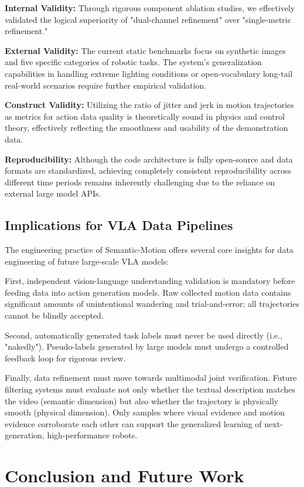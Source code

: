 \documentclass[11pt,oneside]{report}
\begin{document}
\textbf{Internal Validity:} Through rigorous component ablation studies, we effectively validated the logical superiority of "dual-channel refinement" over "single-metric refinement."

\textbf{External Validity:} The current static benchmarks focus on synthetic images and five specific categories of robotic tasks. The system's generalization capabilities in handling extreme lighting conditions or open-vocabulary long-tail real-world scenarios require further empirical validation.

\textbf{Construct Validity:} Utilizing the ratio of jitter and jerk in motion trajectories as metrics for action data quality is theoretically sound in physics and control theory, effectively reflecting the smoothness and usability of the demonstration data.

\textbf{Reproducibility:} Although the code architecture is fully open-source and data formats are standardized, achieving completely consistent reproducibility across different time periods remains inherently challenging due to the reliance on external large model APIs.

\section{Implications for VLA Data Pipelines}
The engineering practice of Semantic-Motion offers several core insights for data engineering of future large-scale VLA models:

First, independent vision-language understanding validation is mandatory before feeding data into action generation models. Raw collected motion data contains significant amounts of unintentional wandering and trial-and-error; all trajectories cannot be blindly accepted.

Second, automatically generated task labels must never be used directly (i.e., "nakedly"). Pseudo-labels generated by large models must undergo a controlled feedback loop for rigorous review.

Finally, data refinement must move towards multimodal joint verification. Future filtering systems must evaluate not only whether the textual description matches the video (semantic dimension) but also whether the trajectory is physically smooth (physical dimension). Only samples where visual evidence and motion evidence corroborate each other can support the generalized learning of next-generation, high-performance robots.

\chapter{Conclusion and Future Work}
\end{document}

